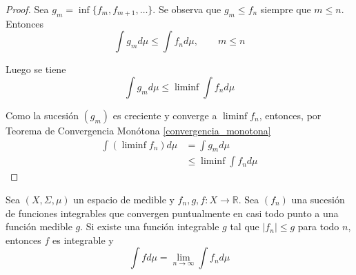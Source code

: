 \begin{proof}
	Sea $g_m = \inf \{ f_m,f_{m+1},\ldots \}$. Se observa que $g_m \leq f_n$ siempre que $m \leq n$. Entonces
	\begin{equation}
		\int g_m d\mu \leq \int f_n d\mu, \qquad m \leq n
	\end{equation}
	
	Luego se tiene
	\begin{equation}
		\int g_m d\mu \leq \liminf 	\int f_n d\mu
	\end{equation}
	
	Como la sucesión $(g_m)$ es creciente y converge a $\liminf f_n$, entonces, por Teorema de Convergencia Monótona \ref{convergencia_monotona}
	\begin{align}
		\int (\liminf f_n) d\mu &= \int g_m d\mu\\
		&\leq \liminf \int f_n d\mu
	\end{align}
\end{proof}

\begin{teorema}\label{convergencia_dominada}
	Sea $(X,\Sigma,\mu)$ un espacio de medible y $f_n,g,f: X \rightarrow \mathbb{R}$. Sea $(f_n)$ una sucesión de funciones integrables que convergen puntualmente en casi todo punto  a una función medible $g$. Si existe una función integrable $g$ tal que $|f_n| \leq g$ para todo $n$, entonces $f$ es integrable y
	\begin{equation}
		\int f d\mu = \lim_{n \rightarrow \infty} \int f_n d\mu
	\end{equation}
\end{teorema}

